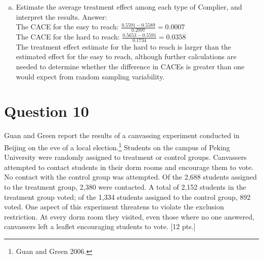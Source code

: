\documentclass[11pt,notitlepage]{article}\usepackage[]{graphicx}\usepackage[]{color}
\begin{document}
\begin{enumerate}[a)]
\item Estimate the average treatment effect among each type of Complier, and interpret the results.
Answer:\\
The CACE for the easy to reach: $\frac{0.5591 - 0.5589}{0.2997} = 0.0007$ \\ 
The CACE for the hard to reach: $\frac{0.5653 - 0.5591}{0.1734} = 0.0358$ \\
The treatment effect estimate for the hard to reach is larger than the estimated effect for the easy to reach, although further calculations are needed to determine whether the difference in CACEs is greater than one would expect from random sampling variability.

\end{enumerate}

\section*{Question 10}
Guan and Green report the results of a canvassing experiment conducted in Beijing on the eve of a local election.\footnote{Guan and Green 2006.} Students on the campus of Peking University were randomly assigned to treatment or control groups. Canvassers attempted to contact students in their dorm rooms and encourage them to vote. No contact with the control group was attempted. Of the 2,688 students assigned to the treatment group, 2,380 were contacted. A total of 2,152 students in the treatment group voted; of the 1,334 students assigned to the control group, 892 voted. One aspect of this experiment threatens to violate the exclusion restriction. At every dorm room they visited, even those where no one answered, canvassers left a leaflet encouraging students to vote. [12 pts.]
\end{document}
